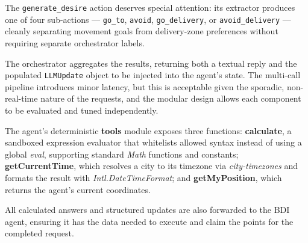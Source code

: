 The \texttt{generate\_desire} action deserves special attention: its extractor produces one of four sub-actions --- \texttt{go\_to}, \texttt{avoid}, \texttt{go\_delivery}, or \texttt{avoid\_delivery} --- cleanly separating movement goals from delivery-zone preferences without requiring separate orchestrator labels.

The orchestrator aggregates the results, returning both a textual reply and the populated \texttt{LLMUpdate} object to be injected into the agent's state. The multi-call pipeline introduces minor latency, but this is acceptable given the sporadic, non-real-time nature of the requests, and the modular design allows each component to be evaluated and tuned independently.

The agent's deterministic \textbf{tools} module exposes three functions: \textbf{calculate}, a sandboxed expression evaluator that whitelists allowed syntax instead of using a global \textit{eval}, supporting standard \textit{Math} functions and constants; \textbf{getCurrentTime}, which resolves a city to its timezone via \textit{city-timezones} and formats the result with \textit{Intl.DateTimeFormat}; and \textbf{getMyPosition}, which returns the agent's current coordinates.

All calculated answers and structured updates are also forwarded to the BDI agent, ensuring it has the data needed to execute and claim the points for the completed request.
